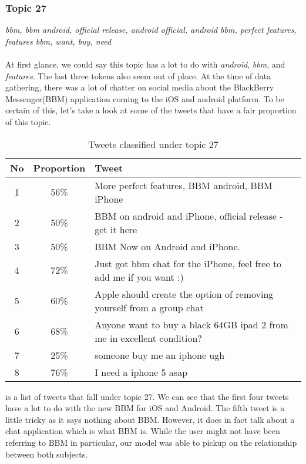\subsubsection{Topic 27}
\label{sec:topic_27}
\textit{bbm, bbm android, official release, android official, android bbm, perfect features,
features bbm, want, buy, need} \\\\
At first glance, we could say this topic has a lot to do with \textit{android}, \textit{bbm}, and
\textit{features}. The last three tokens also seem out of place. At the time of data gathering,
there was a lot of chatter on social media about the BlackBerry Messenger(BBM) application coming to
the iOS and android platform. To be certain of this, let's take a look at some of the tweets that
have a fair proportion of this topic.

\begin{table}[H]
  \begin{tabular}{c c p{13cm}} \toprule
    No & Proportion & Tweet \\ \midrule
    1  & 56\%       & More perfect features, BBM android, BBM iPhone \\ \midrule
    2  & 50\%       & BBM on android and iPhone, official release - get it here \\ \midrule
    3  & 50\%       & BBM Now on Android and iPhone. \\ \midrule
    4  & 72\%       & Just got bbm chat for the iPhone, feel free to add me if you want :) \\ \midrule
    5  & 60\%       & Apple should create the option of removing yourself from a group chat \\ \midrule
    6  & 68\%       & Anyone want to buy a black 64GB ipad 2 from me in excellent condition? \\ \midrule
    7  & 25\%       & someone buy me an iphone ugh \\ \midrule
    8  & 76\%       & I need a iphone 5 asap \\ \bottomrule
  \end{tabular}
  \caption{Tweets classified under topic 27}
  \label{tab:tweets_under_27}
\end{table}

 is a list of tweets that fall under topic 27. We can see that the
first four tweets have a lot to do with the new BBM for iOS and Android. The fifth tweet is a little
tricky as it says nothing about BBM\@. However, it does in fact talk about a chat application which is
what BBM is. While the user might not have been referring to BBM in particular, our model was able
to pickup on the relationship between both subjects.

